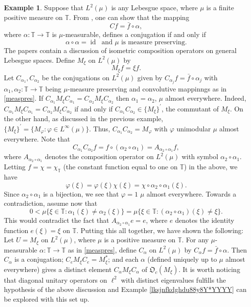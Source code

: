 \documentclass{dis}
\theoremstyle{plain}
\theoremstyle{definition}
\newtheorem{Example}[equation]{Example}
\def\T{\mathbb{T}}
\renewcommand{\phi}{\varphi}
\newcommand{\0}{{\color{lightgray}0}}
\begin{document}
\begin{Example}\label{MxionL63}
Suppose that $L^2(\mu)$ is any Lebesgue space, where $\mu$ is a finite positive measure on $\T$. From \cite[Prop.~7.2]{MR4077555}, one can show that the mapping
$$C f = \bar f \circ \alpha,$$ where $\alpha\colon \T\to \T$ is $\mu$-measurable, defines a conjugation if and only if 
\begin{equation}\label{measpres}
\alpha \circ \alpha = \operatorname{id} \; \; \mbox{and $\mu$ is measure preserving}.
\end{equation}
The papers \cite{MR2618485, MR355679, MR492057} contain a discussion of isometric composition operators on general Lebesgue spaces. 
Define 
$M_{\xi}$ on $L^2(\mu)$ by 
$$M_{\xi} f = \xi f.$$
 Let $C_{\alpha_1},C_{\alpha_2}$ be the conjugations on $ L^2(\mu)$ given by $C_{\alpha_j} f = \bar{f} \circ \alpha_j$ with $\alpha_1,\alpha_2\colon \T\to\T$ being $\mu$-measure preserving and convolutive mappinngs as in \eqref{measpres}.
If  $C_{\alpha_1}M_{\xi} C_{\alpha_1}=C_{\alpha_2}M_{\xi} C_{\alpha_2}$ then $\alpha_1=\alpha_2$, $\mu$ almost everywhere. Indeed,
$C_{\alpha_1}M_{\xi} C_{\alpha_1}=C_{\alpha_2}M_{\xi} C_{\alpha_2}$ if and only if  $C_{\alpha_1} C_{\alpha_2}\in\{M_{\xi}\}^\prime$, the commutant of $M_{\xi}$.
On the other hand, as discussed in the previous example,  $\{M_{\xi}\}^\prime=\{M_\varphi\colon \varphi\in L^\infty(\mu)\}$.
Thus, $C_{\alpha_1} C_{\alpha_2}=M_{\phi}$ with $\phi$ unimodular $\mu$ almost everywhere.
Note that
$$
C_{\alpha_1} C_{\alpha_2} f = f \circ (\alpha_2 \circ \alpha_1)  = A_{\alpha_2\circ\alpha_1} f,
$$
where $A_{\alpha_2\circ\alpha_1}$ denotes the composition operator on $L^2(\mu)$ with symbol $\alpha_{2} \circ \alpha_{1}$. 
Letting $f = \chi = \chi_{\T}$ (the constant function equal to one on $\T$) in the above, we have
$$\varphi(\xi) = \phi(\xi) \chi(\xi)= \chi \circ \alpha_2\circ \alpha_1 (\xi).$$
Since  $\alpha_2\circ \alpha_1$ is a bijection, we see that $\varphi = 1$ $\mu$ almost everywhere.
Towards a contradiction, assume now that  
$$0<\mu\{ \xi \in \T:  \alpha_1(\xi)\not=\alpha_2(\xi)\}=\mu\{\xi \in \T:  (\alpha_2\circ\alpha_1)(\xi)\not=\xi\}.$$
This would contradict the fact that  $A_{\alpha_2\circ\alpha_1} e = e$, where $e$ denotes the identity function $e(\xi) = \xi$ on $\T$. Putting this all together, we have shown the following: Let $U = M_{\xi}$ on $L^2(\mu)$, where $\mu$ is a positive measure on $\T$. For any $\mu$-measurable $\alpha\colon\T\to\T$ as in \eqref{measpres}, define $C_\alpha$  on $L^2(\mu)$ by $C_{\alpha} f = \bar f\circ \alpha$. Then $C_\alpha$ is a conjugation; $C_{e}M_{\xi} C_{e}= M_{\xi}^{*}$; and each $\alpha$ (defined uniquely up to $\mu$ almost everywhere) gives a distinct  element  $C_\alpha M_{\xi} C_\alpha$ of $\mathfrak{O}_c(M_{\xi})$.
It is worth noticing that diagonal unitary operators on $\ell^2$ with distinct eigenvalues fulfills the hypothesis of the above discussion and Example \ref{lksjnfkdghdu88y8Y*YYYY} can be explored with this set up.
\end{Example}
\end{document}
